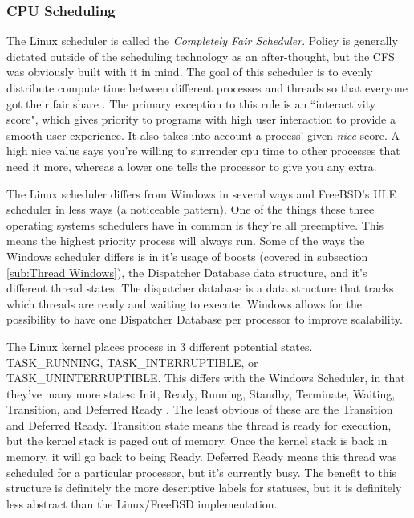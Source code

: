 \documentclass[10pt,draftclsnofoot,onecolumn]{IEEEtran}
\begin{document}
\subsubsection{CPU Scheduling}
\label{sub:CPU Scheduling Linux}
\par The Linux scheduler is called the \textit{Completely Fair Scheduler}.
Policy is generally dictated outside of the scheduling technology as an after-thought, but the CFS was obviously built with it in mind.
The goal of this scheduler is to evenly distribute compute time between different processes and threads so that everyone got their fair share \cite{linux:1}.
The primary exception to this rule is an ``interactivity score", which gives priority to programs with high user interaction to provide a smooth user experience.
It also takes into account a process' given \textit{nice} score.
A high nice value says you're willing to surrender cpu time to other processes that need it more, whereas a lower one tells the processor to give you any extra.

\par The Linux scheduler differs from Windows in several ways and FreeBSD's ULE scheduler in less ways (a noticeable pattern).
One of the things these three operating systems schedulers have in common is they're all preemptive.
This means the highest priority process will always run.
Some of the ways the Windows scheduler differs is in it's usage of boosts (covered in subsection \ref{sub:Thread Windows}), the Dispatcher Database data structure, and it's different thread states.
The dispatcher database is a data structure that tracks which threads are ready and waiting to execute.
Windows allows for the possibility to have one Dispatcher Database per processor to improve scalability.

\par The Linux kernel places process in 3 different potential states. TASK\_RUNNING, TASK\_INTERRUPTIBLE, or TASK\_UNINTERRUPTIBLE.
This differs with the Windows Scheduler, in that they've many more states: Init, Ready, Running, Standby, Terminate, Waiting, Transition, and Deferred Ready \cite{win:1}.
The least obvious of these are the Transition and Deferred Ready.
Transition state means the thread is ready for execution, but the kernel stack is paged out of memory.
Once the kernel stack is back in memory, it will go back to being Ready.
Deferred Ready means this thread was scheduled for a particular processor, but it's currently busy.
The benefit to this structure is definitely the more descriptive labels for statuses, but it is definitely less abstract than the Linux/FreeBSD implementation.
\end{document}
